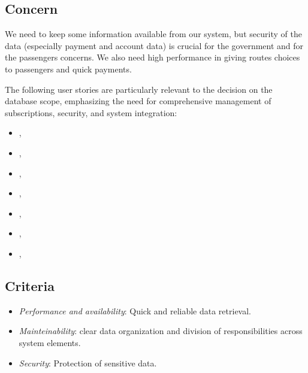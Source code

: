 \subsection*{Concern}
We need to keep some information available from our system, but security of the data (especially payment and account data) is crucial for the government and for the passengers concerns.
We also need high performance in giving routes choices to passengers and quick payments.

The following user stories are particularly relevant to the decision on the database scope, emphasizing the need for comprehensive management of subscriptions, security, and system integration:

\begin{itemize}[noitemsep]
    \item \userStoryOne, 
    \item \userStoryTwo,
    \item \userStoryFour,
    \item \userStorySixteen,
    \item \userStoryEighteen,
    \item \userStoryTwentyThree,
    \item \userStoryTwentySeven,
\end{itemize}

\subsection*{Criteria}
\begin{itemize}[noitemsep]
    \item \textit{Performance and availability}: Quick and reliable data retrieval.
    \item \textit{Mainteinability}: clear data organization and division of responsibilities across system elements.
    \item \textit{Security}: Protection of sensitive data.
\end{itemize}

